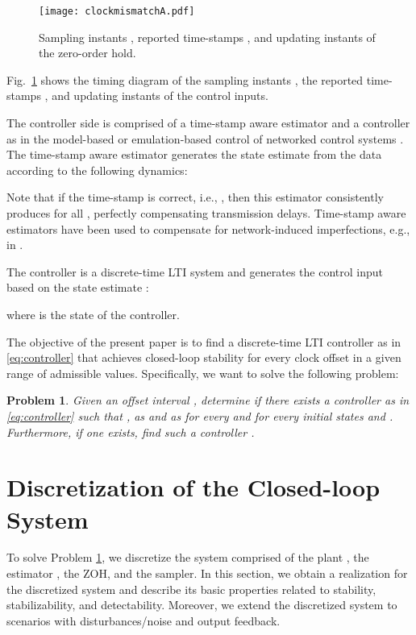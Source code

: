 \documentclass[letterpaper, 12pt, draftcls, onecolumn]{ieeeconf}
\newtheorem{problem}[theorem]{Problem}
\begin{document}
\begin{figure}[tb]
	\centering
	\texttt{[image: clockmismatchA.pdf]}
	\caption{Sampling instants , reported time-stamps , 
		and updating instants  of the zero-order hold.}
	\label{fig:clockmismatch}
\end{figure}


Fig.~\ref{fig:clockmismatch} shows the timing diagram
of the sampling instants ,
the reported time-stamps , 
and updating instants  of the control inputs.

The controller side is comprised of a time-stamp aware estimator and a
controller
as in the model-based or emulation-based control of 
networked control systems \cite{Garcia2014}.
The time-stamp aware estimator generates 
the state estimate 
from the data  according to the following dynamics:
 
Note that if the time-stamp is correct, i.e., 
, then this estimator consistently produces 
 for all , perfectly compensating
transmission delays.
Time-stamp aware estimators have been used to compensate for
network-induced imperfections, e.g., in \cite{Graham2004,Nakamura2008,Garcia2014}.


The controller is a discrete-time LTI system and 
generates the control input  based on the state estimate :
 
where  is the state of the controller.


The objective of the present paper is to find
a discrete-time LTI controller  as in \eqref{eq:controller} 
that achieves closed-loop stability for every
clock offset in a given range of admissible values.
Specifically, we want to solve the following problem:
\begin{problem}
	\label{problem:clockoffset}
	{\it
		Given an offset interval ,
		determine if there exists a controller  as in \eqref{eq:controller} such that
		,  as  and
		 as  
		for every 
		and for every initial states  and .
		Furthermore, if one exists, find such a controller .
	}
\end{problem}




\section{Discretization of the Closed-loop System}
To solve Problem \ref{problem:clockoffset},
we discretize the system comprised of 
the plant , the estimator , the ZOH, and the sampler.
In this section, we obtain a realization for the discretized system and 
describe its basic properties related to stability, stabilizability, and detectability.
Moreover, we extend the discretized system to scenarios with
disturbances/noise and output feedback.
\end{document}
